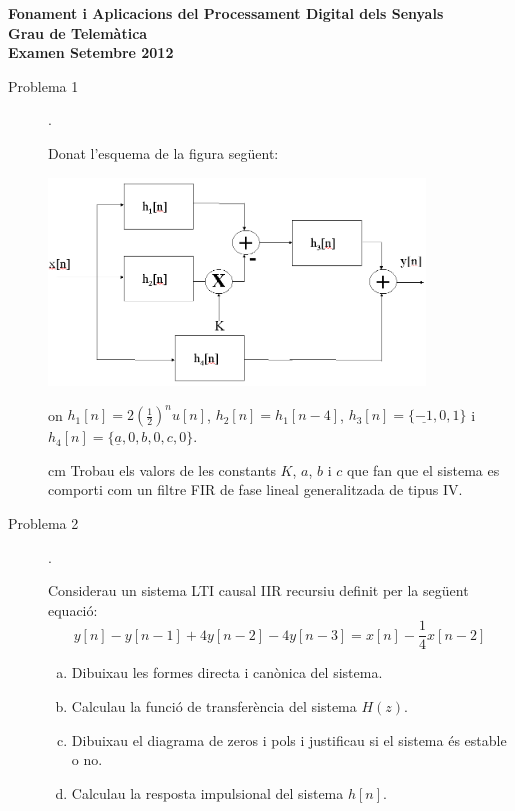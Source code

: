 \documentclass{article}[12pt]
\begin{document}
\begin{center}
\textbf{\Large Fonament i Aplicacions del Processament Digital dels Senyals \\ Grau de Telemàtica \\ Examen Setembre 2012}
\end{center}

\begin{description}

\item[Problema 1]. 

Donat l'esquema de la figura següent:

\begin{center}
\includegraphics[width=10cm]{esquemaP1.png}
\end{center}

\noindent
on $h_1[n]=2 (\frac{1}{2})^n u[n]$, $h_2[n]=h_1[n-4]$, $h_3[n]=\{ \underline{-1}, 0, 1 \}$
i $h_4[n]=\{ \underline{a}, 0, b, 0, c, 0 \}$.

 cm
\noindent
Trobau els valors de les constants $K$, $a$, $b$ i $c$ que fan que el sistema es comporti com
un filtre FIR de fase lineal generalitzada de tipus IV.


\vskip 0.5cm


\item[Problema 2].

Considerau un sistema LTI causal IIR recursiu definit per la següent equació:
\[
y[n]-y[n-1]+4y[n-2]-4y[n-3]=x[n]-\frac{1}{4}x[n-2]
\]

\begin{enumerate}[a)]
\item Dibuixau les formes directa i canònica del sistema.
\item Calculau la funció de transferència del sistema $H(z)$.
\item Dibuixau el diagrama de zeros i pols i justificau si el sistema és estable o no.
\item Calculau la resposta impulsional del sistema $h[n]$.
\end{enumerate}  



\end{description}
\end{document}
